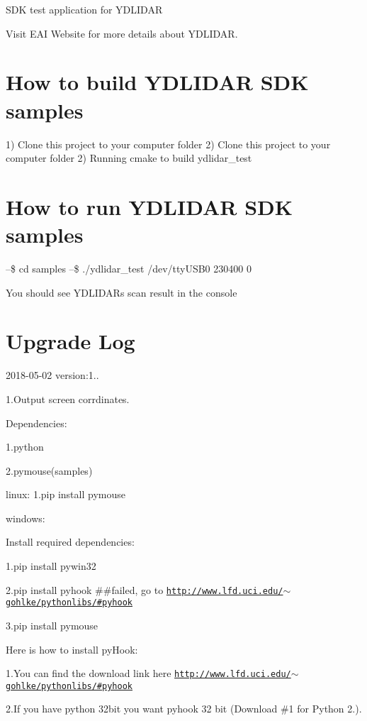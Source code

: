 S\+DK test application for Y\+D\+L\+I\+D\+AR

Visit E\+AI Website for more details about Y\+D\+L\+I\+D\+AR.

\section*{How to build Y\+D\+L\+I\+D\+AR S\+DK samples }

1) Clone this project to your computer folder 2) Clone this project to your computer folder 2) Running cmake to build ydlidar\+\_\+test

\section*{How to run Y\+D\+L\+I\+D\+AR S\+DK samples }

--\$ cd samples --\$ ./ydlidar\+\_\+test /dev/tty\+U\+S\+B0 230400 0

You should see Y\+D\+L\+I\+D\+AR\textquotesingle{}s scan result in the console

\section*{Upgrade Log }

2018-\/05-\/02 version\+:1..

1.\+Output screen corrdinates.

Dependencies\+:

1.\+python

2.\+pymouse(samples)

linux\+: 1.\+pip install pymouse

windows\+:

Install required dependencies\+:

1.\+pip install pywin32

2.\+pip install pyhook \#\#failed, go to \href{http://www.lfd.uci.edu/~gohlke/pythonlibs/#pyhook}{\tt http\+://www.\+lfd.\+uci.\+edu/$\sim$gohlke/pythonlibs/\#pyhook}

3.\+pip install pymouse

Here is how to install py\+Hook\+:

1.\+You can find the download link here \href{http://www.lfd.uci.edu/~gohlke/pythonlibs/#pyhook}{\tt http\+://www.\+lfd.\+uci.\+edu/$\sim$gohlke/pythonlibs/\#pyhook}

2.\+If you have python 32bit you want pyhook 32 bit (Download \#1 for Python 2.).


